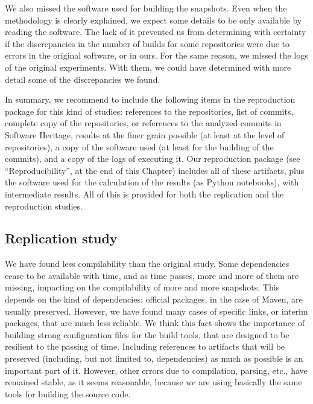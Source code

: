 We also missed the software used for building the snapshots. Even when the methodology is clearly explained, we expect some details to be only available by reading the software. The lack of it prevented us from determining with certainty if the discrepancies in the number of builds for some repositories were due to errors in the original software, or in ours. For the same reason, we missed the logs of the original experiments. With them, we could have determined with more detail some of the discrepancies we found.

In summary, we recommend to include the following items in the reproduction package for this kind of studies: references to the repositories, list of commits, complete copy of the repositories, or references to the analyzed commits in Software Heritage, results at the finer grain possible (at least at the level of repositories), a copy of the software used (at least for the building of the commits), and a copy of the logs of executing it. Our reproduction package (see ``Reproducibility'', at the end of this Chapter) includes all of these artifacts, plus the software used for the calculation of the results (as Python notebooks), with intermediate results. All of this is provided for both the replication and the reproduction studies.

\subsection{Replication study}

We have found less compilability than the original study. Some dependencies cease to be available with time, and as time passes, more and more of them are missing, impacting on the compilability of more and more snapshots. This depends on the kind of dependencies: official packages, in the case of Maven, are usually preserved. However, we have found many cases of specific links, or interim packages, that are much less reliable. We think this fact shows the importance of building strong configuration files for the build tools, that are designed to be resilient to the passing of time. Including references to artifacts that will be preserved (including, but not limited to, dependencies) as much as possible is an important part of it.
However, other errors due to compilation, parsing, etc., have remained stable, as it seems reasonable, because we are using basically the same tools for building the source code.

